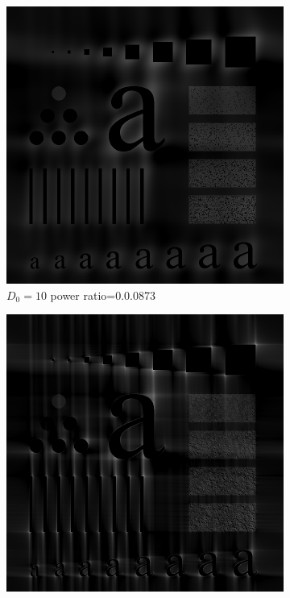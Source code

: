 \begin{figure}[h!]
	\centering
	\begin{subfigure}[b]{0.3\linewidth}
		\includegraphics[width=\linewidth]{myfigure/p3/GHPF_10.png}
		\caption{$D_0=10$ power ratio=0.0.0873}
		\label{fig:GHPF_10}
	\end{subfigure}
  	\begin{subfigure}[b]{0.3\linewidth}
		\includegraphics[width=\linewidth]{myfigure/p3/GHPF_100.png}

\end{subfigure}
\end{figure}
